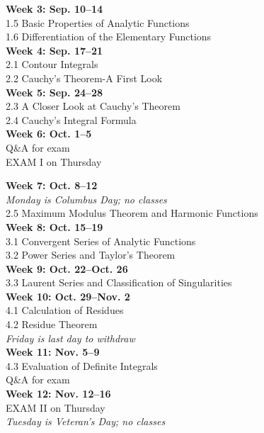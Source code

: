 \documentclass[11pt]{article}
\begin{document}
{\bf Week 3: Sep. 10--14}\\ %
1.5 Basic Properties of Analytic Functions\\
1.6 Differentiation of the Elementary Functions\\


{\bf Week 4: Sep. 17--21}\\ %
2.1 Contour Integrals\\
2.2 Cauchy's Theorem-A First Look\\

{\bf Week 5: Sep. 24--28}\\ 
2.3 A Closer Look at Cauchy's Theorem\\
2.4 Cauchy's Integral Formula\\

{\bf Week 6: Oct. 1--5}\\ 
Q\&A for exam\\
EXAM I on Thursday\\ 
\newpage

{\bf Week 7: Oct. 8--12}\\ 
{\it Monday is Columbus Day; no classes}\\
2.5 Maximum Modulus Theorem and Harmonic Functions\\

{\bf Week 8: Oct. 15--19}\\ 
3.1 Convergent Series of Analytic Functions\\
3.2 Power Series and Taylor's Theorem\\

{\bf Week 9: Oct. 22--Oct. 26} \\ 
3.3 Laurent Series and Classification of Singularities  \\

{\bf Week 10: Oct. 29--Nov. 2}\\
4.1 Calculation of Residues\\
4.2 Residue Theorem\\
{\it  Friday is last day to withdraw}\\

{\bf Week 11: Nov. 5--9}\\ 
4.3 Evaluation of Definite Integrals\\
Q\&A for exam\\ 


{\bf Week 12: Nov. 12--16}\\
EXAM II on Thursday\\ 
{\it Tuesday  is Veteran's Day; no classes}\\ 
\end{document}
